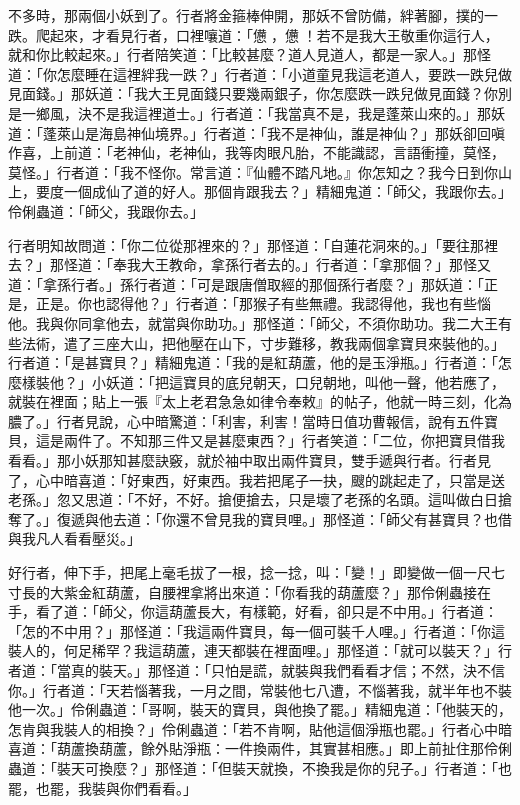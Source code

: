 不多時，那兩個小妖到了。行者將金箍棒伸開，那妖不曾防備，絆著腳，撲的一跌。爬起來，才看見行者，口裡嚷道：「憊𪬯，憊𪬯！若不是我大王敬重你這行人，就和你比較起來。」行者陪笑道：「比較甚麼？道人見道人，都是一家人。」那怪道：「你怎麼睡在這裡絆我一跌？」行者道：「小道童見我這老道人，要跌一跌兒做見面錢。」那妖道：「我大王見面錢只要幾兩銀子，你怎麼跌一跌兒做見面錢？你別是一鄉風，決不是我這裡道士。」行者道：「我當真不是，我是蓬萊山來的。」那妖道：「蓬萊山是海島神仙境界。」行者道：「我不是神仙，誰是神仙？」那妖卻回嗔作喜，上前道：「老神仙，老神仙，我等肉眼凡胎，不能識認，言語衝撞，莫怪，莫怪。」行者道：「我不怪你。常言道：『仙體不踏凡地。』你怎知之？我今日到你山上，要度一個成仙了道的好人。那個肯跟我去？」精細鬼道：「師父，我跟你去。」伶俐蟲道：「師父，我跟你去。」

行者明知故問道：「你二位從那裡來的？」那怪道：「自蓮花洞來的。」「要往那裡去？」那怪道：「奉我大王教命，拿孫行者去的。」行者道：「拿那個？」那怪又道：「拿孫行者。」孫行者道：「可是跟唐僧取經的那個孫行者麼？」那妖道：「正是，正是。你也認得他？」行者道：「那猴子有些無禮。我認得他，我也有些惱他。我與你同拿他去，就當與你助功。」那怪道：「師父，不須你助功。我二大王有些法術，遣了三座大山，把他壓在山下，寸步難移，教我兩個拿寶貝來裝他的。」行者道：「是甚寶貝？」精細鬼道：「我的是紅葫蘆，他的是玉淨瓶。」行者道：「怎麼樣裝他？」小妖道：「把這寶貝的底兒朝天，口兒朝地，叫他一聲，他若應了，就裝在裡面；貼上一張『太上老君急急如律令奉敕』的帖子，他就一時三刻，化為膿了。」行者見說，心中暗驚道：「利害，利害！當時日值功曹報信，說有五件寶貝，這是兩件了。不知那三件又是甚麼東西？」行者笑道：「二位，你把寶貝借我看看。」那小妖那知甚麼訣竅，就於袖中取出兩件寶貝，雙手遞與行者。行者見了，心中暗喜道：「好東西，好東西。我若把尾子一抉，颼的跳起走了，只當是送老孫。」忽又思道：「不好，不好。搶便搶去，只是壞了老孫的名頭。這叫做白日搶奪了。」復遞與他去道：「你還不曾見我的寶貝哩。」那怪道：「師父有甚寶貝？也借與我凡人看看壓災。」

好行者，伸下手，把尾上毫毛拔了一根，捻一捻，叫：「變！」即變做一個一尺七寸長的大紫金紅葫蘆，自腰裡拿將出來道：「你看我的葫蘆麼？」那伶俐蟲接在手，看了道：「師父，你這葫蘆長大，有樣範，好看，卻只是不中用。」行者道：「怎的不中用？」那怪道：「我這兩件寶貝，每一個可裝千人哩。」行者道：「你這裝人的，何足稀罕？我這葫蘆，連天都裝在裡面哩。」那怪道：「就可以裝天？」行者道：「當真的裝天。」那怪道：「只怕是謊，就裝與我們看看才信；不然，決不信你。」行者道：「天若惱著我，一月之間，常裝他七八遭，不惱著我，就半年也不裝他一次。」伶俐蟲道：「哥啊，裝天的寶貝，與他換了罷。」精細鬼道：「他裝天的，怎肯與我裝人的相換？」伶俐蟲道：「若不肯啊，貼他這個淨瓶也罷。」行者心中暗喜道：「葫蘆換葫蘆，餘外貼淨瓶：一件換兩件，其實甚相應。」即上前扯住那伶俐蟲道：「裝天可換麼？」那怪道：「但裝天就換，不換我是你的兒子。」行者道：「也罷，也罷，我裝與你們看看。」


